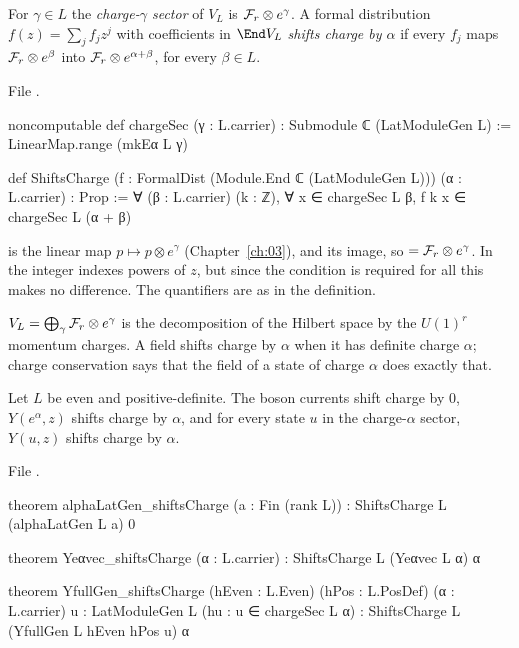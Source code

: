 \begin{definition}\label{l05:def:chargeSec}
For $\gamma\in L$ the \emph{charge-$\gamma$ sector} of $V_L$ is $\mathcal{F}_r\otimes e^\gamma$. A formal distribution
$f(z)=\sum_jf_jz^j$ with coefficients in $\End V_L$ \emph{shifts charge by $\alpha$} if every $f_j$ maps
$\mathcal{F}_r\otimes e^\beta$ into $\mathcal{F}_r\otimes e^{\alpha+\beta}$, for every $\beta\in L$.
\end{definition}

\noindent File .
\begin{leancode}
noncomputable def chargeSec (γ : L.carrier) : Submodule ℂ (LatModuleGen L) :=
  LinearMap.range (mkEα L γ)

def ShiftsCharge (f : FormalDist (Module.End ℂ (LatModuleGen L))) (α : L.carrier) : Prop :=
  ∀ (β : L.carrier) (k : ℤ), ∀ x ∈ chargeSec L β, f k x ∈ chargeSec L (α + β)
\end{leancode}

\begin{dictionary}
 is the linear map $p\mapsto p\otimes e^\gamma$ (Chapter~\ref{ch:03}), and  its
image, so  $=\mathcal{F}_r\otimes e^\gamma$. In  the integer  indexes powers of
$z$, but since the condition is required for all  this makes no difference. The quantifiers are as in the
definition.
\end{dictionary}

\begin{physics}
$V_L=\bigoplus_\gamma\mathcal{F}_r\otimes e^\gamma$ is the decomposition of the Hilbert space by the $U(1)^r$ momentum charges.
A field shifts charge by $\alpha$ when it has definite charge $\alpha$; charge conservation says that the field of a
state of charge $\alpha$ does exactly that.
\end{physics}

\begin{theorem}\label{l05:thm:shifts}
Let $L$ be even and positive-definite. The boson currents shift charge by $0$, $Y(e^\alpha,z)$ shifts charge by
$\alpha$, and for every state $u$ in the charge-$\alpha$ sector, $Y(u,z)$ shifts charge by $\alpha$.
\end{theorem}

\noindent File .
\begin{leancode}
theorem alphaLatGen_shiftsCharge (a : Fin (rank L)) :
    ShiftsCharge L (alphaLatGen L a) 0

theorem Yeαvec_shiftsCharge (α : L.carrier) :
    ShiftsCharge L (Yeαvec L α) α

theorem YfullGen_shiftsCharge (hEven : L.Even) (hPos : L.PosDef) (α : L.carrier)
    {u : LatModuleGen L} (hu : u ∈ chargeSec L α) :
    ShiftsCharge L (YfullGen L hEven hPos u) α
\end{leancode}

